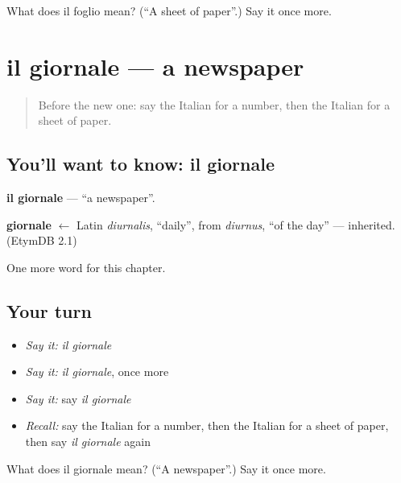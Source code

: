 \begin{tcolorbox}[breakable,colback=teal!4,colframe=teal!35!black,title={Before you move on}]
What does il foglio mean? (\textquotedblleft{}A sheet of paper\textquotedblright{}.) Say it once more.
\end{tcolorbox}
\section[il giornale]{il giornale — a newspaper}

\label{lesson:IT-C232-giornale}



\begin{quote}
Before the new one: say the Italian for a number, then the Italian for a sheet of paper.
\end{quote}

\subsection*{You'll want to know: il giornale}
\textbf{il giornale} — \textquotedblleft{}a newspaper\textquotedblright{}.

\begin{cousinweb}
\textbf{giornale} $\leftarrow$ Latin \emph{diurnalis}, \textquotedblleft{}daily\textquotedblright{}, from \emph{diurnus}, \textquotedblleft{}of the day\textquotedblright{} — inherited. (EtymDB 2.1)
\end{cousinweb}

\begin{grammarlens}[title={What you've built}]
One more word for this chapter.
\end{grammarlens}

\subsection*{Your turn}
\begin{itemize}
\raggedright
  \item \emph{Say it:} \emph{il giornale}
  \item \emph{Say it:} \emph{il giornale}, once more
  \item \emph{Say it:} say \emph{il giornale}
  \item \emph{Recall:} say the Italian for a number, then the Italian for a sheet of paper, then say \emph{il giornale} again
\end{itemize}

\begin{tcolorbox}[breakable,colback=teal!4,colframe=teal!35!black,title={Before you move on}]
What does il giornale mean? (\textquotedblleft{}A newspaper\textquotedblright{}.) Say it once more.
\end{tcolorbox}
